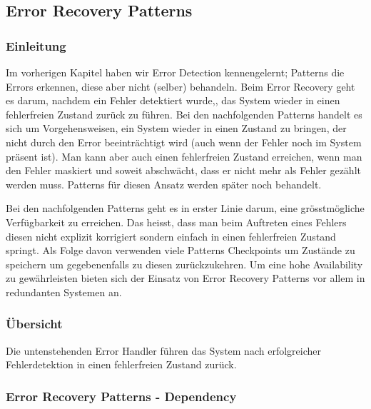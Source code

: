 \subsection{Error Recovery Patterns}


\subsubsection*{Einleitung}


Im vorherigen Kapitel haben wir Error Detection kennengelernt; Patterns die Errors erkennen, diese aber nicht (selber) behandeln. Beim Error Recovery geht es darum, nachdem ein Fehler detektiert wurde,, das System wieder in einen fehlerfreien Zustand zurück zu führen. Bei den nachfolgenden Patterns handelt es sich um Vorgehensweisen, ein System wieder in einen Zustand zu bringen, der nicht durch den Error beeinträchtigt wird (auch wenn der Fehler noch im System präsent ist). Man kann aber auch einen fehlerfreien Zustand erreichen, wenn man den Fehler maskiert und soweit abschwächt, dass er nicht mehr als Fehler gezählt werden muss. Patterns für diesen Ansatz werden später noch behandelt.

Bei den nachfolgenden Patterns geht es in erster Linie darum, eine grösstmögliche Verfügbarkeit zu erreichen. Das heisst, dass man beim Auftreten eines Fehlers diesen nicht explizit korrigiert sondern einfach in einen fehlerfreien Zustand springt. Als Folge davon verwenden viele Patterns Checkpoints um Zustände zu speichern um gegebenenfalls zu diesen zurückzukehren. Um eine hohe Availability zu gewährleisten bieten sich der Einsatz von Error Recovery Patterns vor allem in redundanten Systemen an.

\subsubsection*{Übersicht}


Die untenstehenden Error Handler führen das System nach erfolgreicher Fehlerdetektion in einen fehlerfreien Zustand zurück.

\subsubsection*{Error Recovery Patterns - Dependency}

